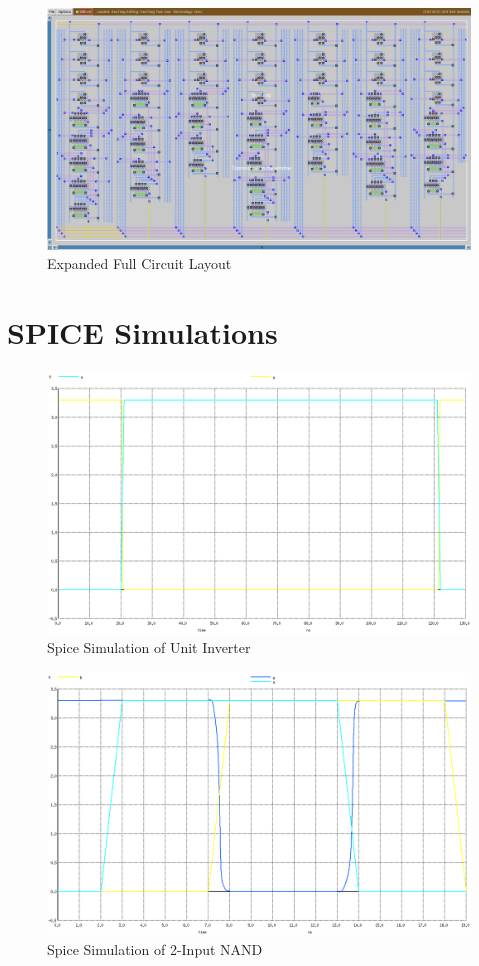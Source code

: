 \documentclass[12pt]{article}
\begin{document}
\clearpage
\begin{figure}
	\includegraphics[width=\textwidth]{Graphics/hex7seg_expanded}
	\caption{Expanded Full Circuit Layout}
	\label{fig:hex7seg_expanded}
\end{figure}
\clearpage
\section{SPICE Simulations}
\label{app:spice}

\begin{figure}[H]
	\centering
	\includegraphics[width=0.70\linewidth, keepaspectratio]{Graphics/1INV_spice}
	\caption{Spice Simulation of Unit Inverter}
	\label{fig:spice_INV}
\end{figure}

\begin{figure}[H]
	\centering
	\includegraphics[width=0.70\linewidth, keepaspectratio]{Graphics/2NAND_spice}
	\caption{Spice Simulation of 2-Input NAND}
	\label{fig:spice_2NAND}
\end{figure}
\end{document}
